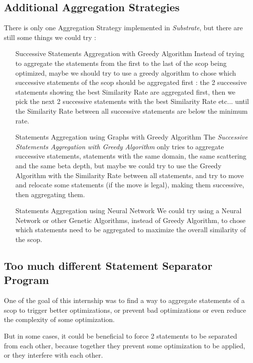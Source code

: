 \documentclass[paper=a4, fontsize=11.5pt]{scrartcl}
\numberwithin{equation}{section}        %
\numberwithin{figure}{section}          %
\numberwithin{table}{section}               %
\begin{document}
    \subsection{Additional Aggregation Strategies}
        There is only one Aggregation Strategy implemented in \textit{Substrate}, but
        there are still some things we could try :
        \begin{enumerate}
        \item[Successive Statements Aggregation with Greedy Algorithm]
            Instead of trying to aggregate the statements from the first to the last
            of the scop being optimized, maybe we should try to use a greedy algorithm
            to chose which successive statements of the scop should be aggregated first :
            the 2 successive statements showing the best Similarity Rate are aggregated
            first, then we pick the next 2 successive statements with the best Similarity Rate etc...
            until the Similarity Rate between all successive statements are below the minimum rate.\\
        \item[Statements Aggregation using Graphs with Greedy Algorithm]
            The \textit{Successive Statements Aggregation with Greedy Algorithm} only
            tries to aggregate successive statements, statements with the same domain,
            the same scattering and the same beta depth, but maybe we could try to
            use the Greedy Algorithm with the Similarity Rate between all statements,
            and try to move and relocate some statements (if the move is legal),
            making them successive, then aggregating them.
        \item[Statements Aggregation using Neural Network]
            We could try using a Neural Network or other Genetic Algorithms, instead
            of Greedy Algorithm, to chose which statements need to be aggregated to
            maximize the overall similarity of the scop.
    \end{enumerate}
    \subsection{Too much different Statement Separator Program}
        One of the goal of this internship was to find a way to aggregate statements
        of a scop to trigger better optimizations, or prevent bad optimizations or even
        reduce the complexity of some optimization.

        But in some cases, it could be beneficial to force 2 statements to be separated
        from each other, because together they prevent some optimization to be applied,
        or they interfere with each other.
\end{document}
